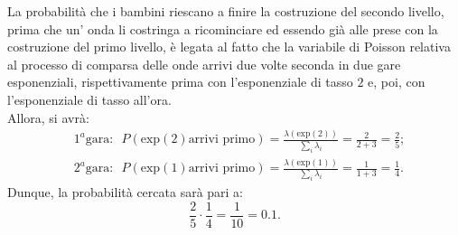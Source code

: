 \documentclass[12pt]{homework}
\begin{document}
\begin{alphaparts}
\questionpart
La probabilità che i bambini riescano a finire la costruzione del secondo livello, prima che un' onda li costringa a ricominciare ed essendo già alle prese con la costruzione del primo livello, è legata al fatto che la variabile di Poisson relativa al processo di comparsa delle onde arrivi due volte seconda in due gare esponenziali, rispettivamente prima con l'esponenziale di tasso $2$ e, poi, con l'esponenziale di tasso all'ora.\\
Allora, si avrà:
\begin{align*}
&1^{a} \text{gara}: \,\,\, P\left(\text{exp}\left(2\right) \text{arrivi primo}\right)=\frac{\lambda\left(\text{exp}\left(2\right)\right)}{\sum_{i}\lambda_{i}}=\frac{2}{2+3}=\frac{2}{5};\\
&2^{a} \text{gara}: \,\,\, P\left(\text{exp}\left(1\right) \text{arrivi primo}\right)=\frac{\lambda\left(\text{exp}\left(1\right)\right)}{\sum_{i}\lambda_{i}}=\frac{1}{1+3}=\frac{1}{4}.
\end{align*}  
Dunque, la probabilità cercata sarà pari a:
\begin{equation*}
\frac{2}{5}\cdot \frac{1}{4}=\frac{1}{10}= 0.1.
\end{equation*}
 \end{alphaparts}
    
    
\newpage
\end{document}
